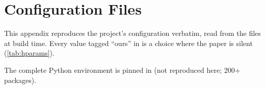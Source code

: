 \chapter{Configuration Files}\label{app:config}

This appendix reproduces the project's configuration verbatim, read from the files at build time. Every value tagged
``ours'' in  is a choice where the paper is silent (\cref{tab:hparams}).









The complete Python environment is pinned in  (not reproduced here; 200+ packages).
